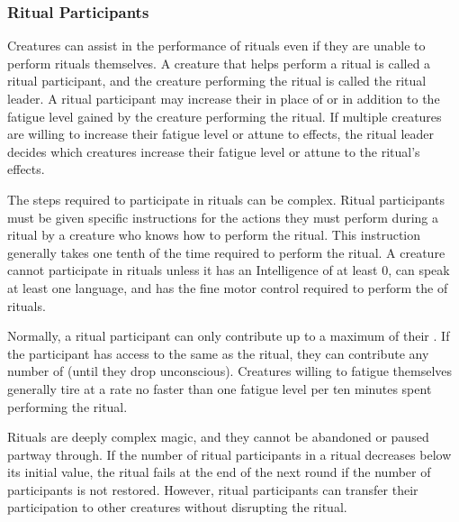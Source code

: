 
        \subsubsection{Ritual Participants}
            Creatures can assist in the performance of rituals even if they are unable to perform rituals themselves.
            A creature that helps perform a ritual is called a ritual participant, and the creature performing the ritual is called the ritual leader.
            A ritual participant may increase their  in place of or in addition to the fatigue level gained by the creature performing the ritual.
            If multiple creatures are willing to increase their fatigue level or attune to effects, the ritual leader decides which creatures increase their fatigue level or attune to the ritual's effects.

            The steps required to participate in rituals can be complex.
            Ritual participants must be given specific instructions for the actions they must perform during a ritual by a creature who knows how to perform the ritual.
            This instruction generally takes one tenth of the time required to perform the ritual.
            A creature cannot participate in rituals unless it has an Intelligence of at least 0, can speak at least one language, and has the fine motor control required to perform the  of rituals.

            Normally, a ritual participant can only contribute  up to a maximum of their .
            If the participant has access to the same  as the ritual, they can contribute any number of  (until they drop unconscious).
            Creatures willing to fatigue themselves generally tire at a rate no faster than one fatigue level per ten minutes spent performing the ritual.

            Rituals are deeply complex magic, and they cannot be abandoned or paused partway through.
            If the number of ritual participants in a ritual decreases below its initial value, the ritual fails at the end of the next round if the number of participants is not restored.
            However, ritual participants can transfer their participation to other creatures without disrupting the ritual.

